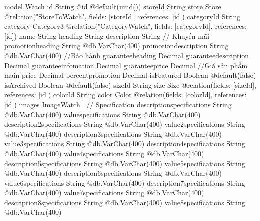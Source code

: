 model Watch {
  id                          String                      @id @default(uuid())
  storeId                     String
  store                       Store                       @relation("StoreToWatch", fields: [storeId], references: [id])
  categoryId             String
  category               Category3                   @relation("CategoryWatch", fields: [categoryId], references: [id])
  name                        String
  heading                     String
  description                 String
  // Khuyến mãi
  promotionheading            String                      @db.VarChar(400)
  promotiondescription        String                      @db.VarChar(400)
  //Bảo hành
  guaranteeheading            Decimal
  guaranteedescription        Decimal
  guaranteeinfomation         Decimal
  guaranteeprice              Decimal
  //Giá sản phẩm main
  price                       Decimal
  percentpromotion            Decimal
  isFeatured                  Boolean                     @default(false)
  isArchived                  Boolean                     @default(false)
  sizeId                      String
  size                        Size                        @relation(fields: [sizeId], references: [id])
  colorId                     String
  color                       Color                       @relation(fields: [colorId], references: [id])
  images                 ImageWatch[]
  // Specification
  descriptionspecifications   String                      @db.VarChar(400)
  valuespecifications         String                      @db.VarChar(400)
  description2specifications  String                      @db.VarChar(400)
  value2specifications        String                      @db.VarChar(400)
  description3specifications  String                      @db.VarChar(400)
  value3specifications        String                      @db.VarChar(400)
  description4specifications  String                      @db.VarChar(400)
  value4specifications        String                      @db.VarChar(400)
  description5specifications  String                      @db.VarChar(400)
  value5specifications        String                      @db.VarChar(400)
  description6specifications  String                      @db.VarChar(400)
  value6specifications        String                      @db.VarChar(400)
  description7specifications  String                      @db.VarChar(400)
  value7specifications        String                      @db.VarChar(400)
  description8specifications  String                      @db.VarChar(400)
  value8specifications        String                      @db.VarChar(400)
}

